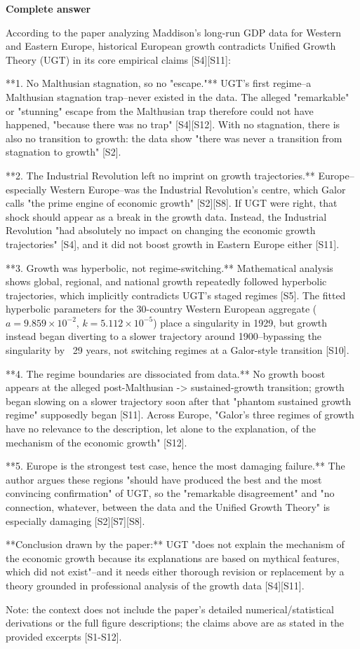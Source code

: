 \documentclass[10pt]{article}
\begin{document}
\textbf{Complete answer}
\begin{AnswerText}
According to the paper analyzing Maddison's long-run GDP data for Western and Eastern Europe, historical European growth contradicts Unified Growth Theory (UGT) in its core empirical claims [S4][S11]:

**1. No Malthusian stagnation, so no "escape."** UGT's first regime--a Malthusian stagnation trap--never existed in the data. The alleged "remarkable" or "stunning" escape from the Malthusian trap therefore could not have happened, "because there was no trap" [S4][S12]. With no stagnation, there is also no transition to growth: the data show "there was never a transition from stagnation to growth" [S2].

**2. The Industrial Revolution left no imprint on growth trajectories.** Europe--especially Western Europe--was the Industrial Revolution's centre, which Galor calls "the prime engine of economic growth" [S2][S8]. If UGT were right, that shock should appear as a break in the growth data. Instead, the Industrial Revolution "had absolutely no impact on changing the economic growth trajectories" [S4], and it did not boost growth in Eastern Europe either [S11].

**3. Growth was hyperbolic, not regime-switching.** Mathematical analysis shows global, regional, and national growth repeatedly followed hyperbolic trajectories, which implicitly contradicts UGT's staged regimes [S5]. The fitted hyperbolic parameters for the 30-country Western European aggregate ($a = 9.859\times10^{-2}$, $k = 5.112\times10^{-5}$) place a singularity in 1929, but growth instead began diverting to a slower trajectory around 1900--bypassing the singularity by ~29 years, not switching regimes at a Galor-style transition [S10].

**4. The regime boundaries are dissociated from data.** No growth boost appears at the alleged post-Malthusian -> sustained-growth transition; growth began slowing on a slower trajectory soon after that "phantom sustained growth regime" supposedly began [S11]. Across Europe, "Galor's three regimes of growth have no relevance to the description, let alone to the explanation, of the mechanism of the economic growth" [S12].

**5. Europe is the strongest test case, hence the most damaging failure.** The author argues these regions "should have produced the best and the most convincing confirmation" of UGT, so the "remarkable disagreement" and "no connection, whatever, between the data and the Unified Growth Theory" is especially damaging [S2][S7][S8].

**Conclusion drawn by the paper:** UGT "does not explain the mechanism of the economic growth because its explanations are based on mythical features, which did not exist"--and it needs either thorough revision or replacement by a theory grounded in professional analysis of the growth data [S4][S11].

Note: the context does not include the paper's detailed numerical/statistical derivations or the full figure descriptions; the claims above are as stated in the provided excerpts [S1-S12].
\end{AnswerText}
\end{document}
